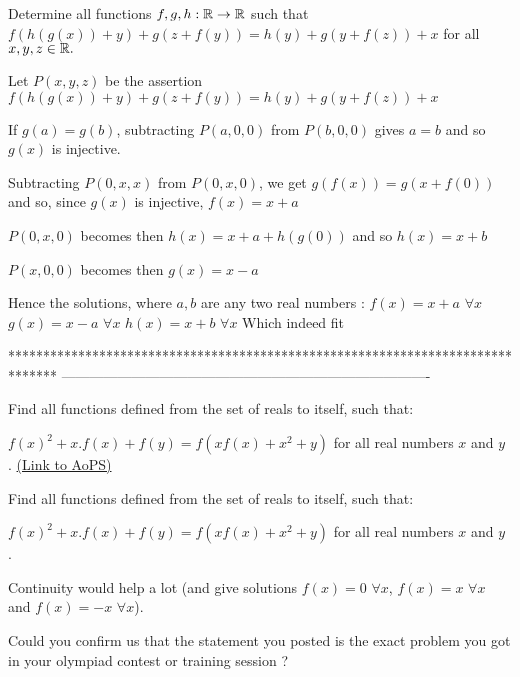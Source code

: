 \begin{solution}
	\begin{tcolorbox}Determine all functions $f,g,h:\Bbb{R}\to\Bbb{R}$ such that $f(h(g(x)) + y) + g(z + f(y)) = h(y) + g(y + f(z)) + x$ for all $x,y,z\in \Bbb{R}.$\end{tcolorbox}
Let $P(x,y,z)$ be the assertion $f(h(g(x))+y)+g(z+f(y))=h(y)+g(y+f(z))+x$

If $g(a)=g(b)$, subtracting $P(a,0,0)$ from $P(b,0,0)$ gives $a=b$ and so $g(x)$ is injective.

Subtracting $P(0,x,x)$ from $P(0,x,0)$, we get $g(f(x))=g(x+f(0))$ and so, since $g(x)$ is injective,  $f(x)=x+a$ 

$P(0,x,0)$ becomes then $h(x)=x+a+h(g(0))$ and so $h(x)=x+b$

$P(x,0,0)$ becomes then $g(x)=x-a$

Hence the solutions, where $a,b$ are any two real numbers :
$f(x)=x+a$ $\forall x$
$g(x)=x-a$ $\forall x$
$h(x)=x+b$ $\forall x$
Which indeed fit
\end{solution}
*******************************************************************************
-------------------------------------------------------------------------------

\begin{problem}
	Find all functions defined from the set of reals to itself, such that: 

$f(x)^2+x.f(x)+f(y)=f(xf(x)+x^2+y) $ for all real numbers $x$ and $y$ .
	\flushright \href{https://artofproblemsolving.com/community/c6h489583}{(Link to AoPS)}
\end{problem}



\begin{solution}
	\begin{tcolorbox}Find all functions defined from the set of reals to itself, such that: 

$f(x)^2+x.f(x)+f(y)=f(xf(x)+x^2+y) $ for all real numbers $x$ and $y$ .\end{tcolorbox}
Continuity would help a lot (and give solutions $f(x)=0$ $\forall x$, $f(x)=x$ $\forall x$ and $f(x)=-x$ $\forall x$).

Could you confirm us that the statement you posted is the exact problem you got in your olympiad contest or training session ?
\end{solution}



